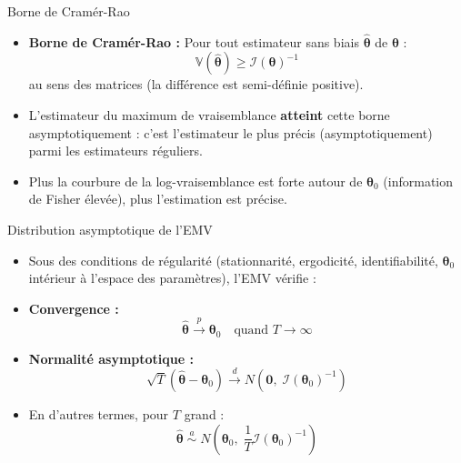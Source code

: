 \documentclass[11pt,aspectratio=169]{beamer}
\newcommand{\Var}{\mathbb{V}}
\begin{document}
\begin{frame}{Borne de Cramér-Rao}

\begin{itemize}

\item \textbf{Borne de Cramér-Rao :} Pour tout estimateur sans biais $\hat{\bm{\theta}}$ de $\bm{\theta}$ :
  \[
  \Var(\hat{\bm{\theta}}) \geq \mathcal{I}(\bm{\theta})^{-1}
  \]
  au sens des matrices (la différence est semi-définie positive).\newline

\item L'estimateur du maximum de vraisemblance \textbf{atteint} cette borne asymptotiquement : c'est l'estimateur le plus précis (asymptotiquement) parmi les estimateurs réguliers.\newline

\item Plus la courbure de la log-vraisemblance est forte autour de $\bm{\theta}_0$ (information de Fisher élevée), plus l'estimation est précise.

\end{itemize}

\end{frame}

\begin{frame}{Distribution asymptotique de l'EMV}

\begin{itemize}

\item Sous des conditions de régularité (stationnarité, ergodicité, identifiabilité, $\bm{\theta}_0$ intérieur à l'espace des paramètres), l'EMV vérifie :\newline

\item \textbf{Convergence :}
  \[
  \hat{\bm{\theta}} \xrightarrow{p} \bm{\theta}_0 \quad \text{quand } T \to \infty
  \]\newline

\item \textbf{Normalité asymptotique :}
  \[
  \boxed{\sqrt{T}\left(\hat{\bm{\theta}} - \bm{\theta}_0\right) \xrightarrow{d} N\!\left(\mathbf{0},\; \mathcal{I}(\bm{\theta}_0)^{-1}\right)}
  \]\newline

\item En d'autres termes, pour $T$ grand :
  \[
  \hat{\bm{\theta}} \;\overset{a}{\sim}\; N\!\left(\bm{\theta}_0,\; \frac{1}{T}\mathcal{I}(\bm{\theta}_0)^{-1}\right)
  \]

\end{itemize}

\end{frame}
\end{document}

